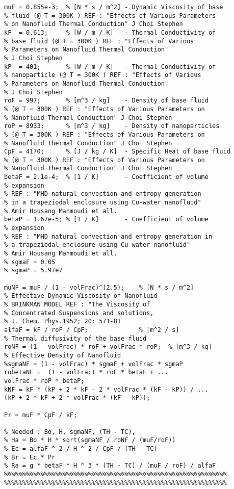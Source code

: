 \begin{lstlisting}
muF = 0.855e-3;  % [N * s / m^2] - Dynamic Viscosity of base 
% fluid (@ T = 300K ) REF : "Effects of Various Parameters 
% on Nanofluid Thermal Conduction" J Choi Stephen
kF  = 0.613;     % [W / m / K]   - Thermal Conductivity of 
% base fluid (@ T = 300K ) REF : "Effects of Various 
% Parameters on Nanofluid Thermal Conduction" 
% J Choi Stephen
kP  = 401;       % [W / m / K]   - Thermal Conductivity of 
% nanoparticle (@ T = 300K ) REF : "Effects of Various 
% Parameters on Nanofluid Thermal Conduction" 
% J Choi Stephen
roF = 997;       % [m^3 / kg]    - Density of base fluid 
% (@ T = 300K ) REF : "Effects of Various Parameters on
% Nanofluid Thermal Conduction" J Choi Stephen
roP = 8933;      % [m^3 / kg]    - Density of nanoparticles 
% (@ T = 300K ) REF : "Effects of Various Parameters on 
% Nanofluid Thermal Conduction" J Choi Stephen
CpF = 4170;      % [J / kg / K]  - Specific Heat of base fluid
% (@ T = 300K ) REF : "Effects of Various Parameters on 
% Nanofluid Thermal Conduction" J Choi Stephen
betaF = 2.1e-4;  % [1 / K]       - Coefficient of volume 
% expansion 
% REF : "MHD natural convection and entropy generation
% in a trapeziodal enclosure using Cu-water nanofluid" 
% Amir Housang Mahmoudi et all. 
betaP = 1.67e-5; % [1 / K]       - Coefficient of volume 
% expansion                       
% REF : "MHD natural convection and entropy generation in 
% a trapeziodal enclosure using Cu-water nanofluid" 
% Amir Housang Mahmoudi et all. 
% sgmaF = 0.05
% sgmaP = 5.97e7

muNF = muF / (1 - volFrac)^(2.5);    % [N * s / m^2]  
% Effective Dynamic Viscosity of Nanofluid  
% BRINKMAN MODEL REF : "The Viscosity of 
% Concentrated Suspensions and solutions, 
% J. Chem. Phys.1952; 20: 571-81
alfaF = kF / roF / CpF;              % [m^2 / s]
% Thermal diffusivity of the base fluid 
roNF = (1 - volFrac) * roF + volFrac * roP;  % [m^3 / kg]
% Effective Density of Nanofluid
%sgmaNF = (1 - volFrac) * sgmaF + volFrac * sgmaP
robetaNF =  (1 - volFrac) * roF * betaF + ...
volFrac * roP * betaP;                        
kNF = kF * (kP + 2 * kF - 2 * volFrac * (kF - kP)) / ...
(kP + 2 * kF + 2 * volFrac * (kF - kP)); 

Pr = muF * CpF / kF;

% Needed : Bo, H, sgmaNF, (TH - TC), 
% Ha = Bo * H * sqrt(sgmaNF / roNF / (muF/roF))
% Ec = alfaF ^ 2 / H ^ 2 / CpF / (TH - TC)
% Br = Ec * Pr
% Ra = g * betaF * H ^ 3 * (TH - TC) / (muF / roF) / alfaF
%%%%%%%%%%%%%%%%%%%%%%%%%%%%%%%%%%%%%%%%%%%%%%%%%%%%%%%%%%%%%
%%%%%%%%%%%%%%%%%%%%%%%%%%%%%%%%%%%%%%%%%%%%%%%%%%%%%%%%%%%%%


\end{lstlisting}
